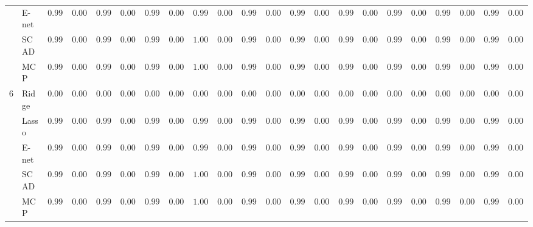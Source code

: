 \begin{tabular}{ll|ll|llllll|llllll|llllll}
 & E-net  & $0.9984$ & $0.0021$ & $0.9961$ & $0.0027$ & $0.9939$ & $0.0031$ & $0.9945$ & $0.0024$ & $0.9983$ & $0.0021$ & $0.9961$ & $0.0040$ & $0.9991$ & $0.0027$ & $0.9978$ & $0.0025$ & $0.9952$ & $0.0032$ & $0.9920$ & $0.0047$ \\
 & SCAD  & $0.9943$ & $0.0051$ & $0.9956$ & $0.0037$ & $0.9979$ & $0.0020$ & $1.0000$ & $0.0000$ & $0.9952$ & $0.0043$ & $0.9934$ & $0.0047$ & $0.9954$ & $0.0040$ & $0.9945$ & $0.0048$ & $0.9964$ & $0.0028$ & $0.9990$ & $0.0012$ \\
 & MCP  & $0.9987$ & $0.0016$ & $0.9987$ & $0.0016$ & $0.9996$ & $0.0007$ & $1.0000$ & $0.0000$ & $0.9986$ & $0.0021$ & $0.9979$ & $0.0021$ & $0.9977$ & $0.0022$ & $0.9983$ & $0.0020$ & $0.9987$ & $0.0014$ & $0.9995$ & $0.0007$ \\\hline
6 & Ridge  & $0.0000$ & $0.0000$ & $0.0000$ & $0.0000$ & $0.0000$ & $0.0000$ & $0.0000$ & $0.0000$ & $0.0000$ & $0.0000$ & $0.0000$ & $0.0000$ & $0.0000$ & $0.0000$ & $0.0000$ & $0.0000$ & $0.0000$ & $0.0000$ & $0.0000$ & $0.0000$ \\
 & Lasso  & $0.9989$ & $0.0017$ & $0.9974$ & $0.0022$ & $0.9953$ & $0.0028$ & $0.9957$ & $0.0023$ & $0.9986$ & $0.0022$ & $0.9971$ & $0.0033$ & $0.9996$ & $0.0026$ & $0.9985$ & $0.0019$ & $0.9966$ & $0.0028$ & $0.9928$ & $0.0049$ \\
 & E-net  & $0.9984$ & $0.0021$ & $0.9961$ & $0.0027$ & $0.9939$ & $0.0031$ & $0.9945$ & $0.0024$ & $0.9979$ & $0.0026$ & $0.9961$ & $0.0040$ & $0.9991$ & $0.0027$ & $0.9978$ & $0.0025$ & $0.9952$ & $0.0032$ & $0.9920$ & $0.0047$ \\
 & SCAD  & $0.9943$ & $0.0051$ & $0.9956$ & $0.0037$ & $0.9979$ & $0.0020$ & $1.0000$ & $0.0000$ & $0.9947$ & $0.0047$ & $0.9934$ & $0.0047$ & $0.9954$ & $0.0040$ & $0.9945$ & $0.0048$ & $0.9964$ & $0.0028$ & $0.9990$ & $0.0012$ \\
 & MCP  & $0.9987$ & $0.0016$ & $0.9987$ & $0.0016$ & $0.9996$ & $0.0007$ & $1.0000$ & $0.0000$ & $0.9984$ & $0.0021$ & $0.9979$ & $0.0021$ & $0.9977$ & $0.0022$ & $0.9983$ & $0.0020$ & $0.9987$ & $0.0014$ & $0.9995$ & $0.0007$ \\
\hline 
\end{tabular}

